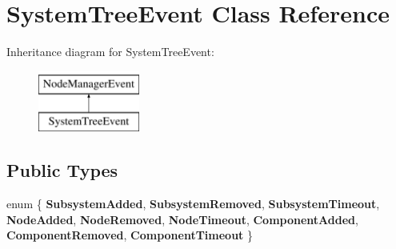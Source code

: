 \hypertarget{class_system_tree_event}{\section{\-System\-Tree\-Event \-Class \-Reference}
\label{class_system_tree_event}
}
\-Inheritance diagram for \-System\-Tree\-Event\-:\begin{figure}[H]
\begin{center}
\leavevmode
\includegraphics[height=2.000000cm]{class_system_tree_event}
\end{center}
\end{figure}
\subsection*{\-Public \-Types}
\begin{DoxyCompactItemize}
\item 
enum \{ \*
{\bfseries \-Subsystem\-Added}, 
{\bfseries \-Subsystem\-Removed}, 
{\bfseries \-Subsystem\-Timeout}, 
{\bfseries \-Node\-Added}, 
\*
{\bfseries \-Node\-Removed}, 
{\bfseries \-Node\-Timeout}, 
{\bfseries \-Component\-Added}, 
{\bfseries \-Component\-Removed}, 
\*
{\bfseries \-Component\-Timeout}
 \}
\end{DoxyCompactItemize}
